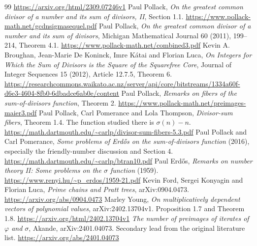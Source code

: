{\begin{thebibliography}{99}
\url{https://arxiv.org/html/2309.07246v1}
 Paul Pollack, \emph{On the greatest common divisor of a number and its sum of divisors, II}, Section 1.1.\newline
\url{https://www.pollack-math.net/gcdnsigmasequel.pdf}
 Paul Pollack, \emph{On the greatest common divisor of a number and its sum of divisors}, Michigan Mathematical Journal 60 (2011), 199--214, Theorem 4.1.\newline
\url{https://www.pollack-math.net/combined3.pdf}
 Kevin A. Broughan, Jean-Marie De Koninck, Imre K\'atai and Florian Luca, \emph{On Integers for Which the Sum of Divisors is the Square of the Squarefree Core}, Journal of Integer Sequences 15 (2012), Article 12.7.5, Theorem 6.\newline
\url{https://researchcommons.waikato.ac.nz/server/api/core/bitstreams/1334a60f-d6e3-4604-8fb0-6dbadce6ab0e/content}
 Paul Pollack, \emph{Remarks on fibers of the sum-of-divisors function}, Theorem 2.\newline
\url{https://www.pollack-math.net/preimages-maier3.pdf}
 Paul Pollack, Carl Pomerance and Lola Thompson, \emph{Divisor-sum fibers}, Theorem 1.4. The function studied there is $\sigma(n)-n$.\newline
\url{https://math.dartmouth.edu/~carlp/divisor-sum-fibers-5.3.pdf}
 Paul Pollack and Carl Pomerance, \emph{Some problems of Erd\H{o}s on the sum-of-divisors function} (2016), especially the friendly-number discussion and Section 4.\newline
\url{https://math.dartmouth.edu/~carlp/btran10.pdf}
 Paul Erd\H{o}s, \emph{Remarks on number theory II: Some problems on the $\sigma$ function} (1959).\newline
\url{https://www.renyi.hu/~p_erdos/1959-21.pdf}
 Kevin Ford, Sergei Konyagin and Florian Luca, \emph{Prime chains and Pratt trees}, arXiv:0904.0473.\newline
\url{https://arxiv.org/abs/0904.0473}
 Marley Young, \emph{On multiplicatively dependent vectors of polynomial values}, arXiv:2402.13704v1. Proposition 1.7 and Theorem 1.8.\newline
\url{https://arxiv.org/html/2402.13704v1}
 \emph{The number of preimages of iterates of $\varphi$ and $\sigma$}, Akande, arXiv:2401.04073. Secondary lead from the original literature list.\newline
\url{https://arxiv.org/abs/2401.04073}

\end{thebibliography}}
